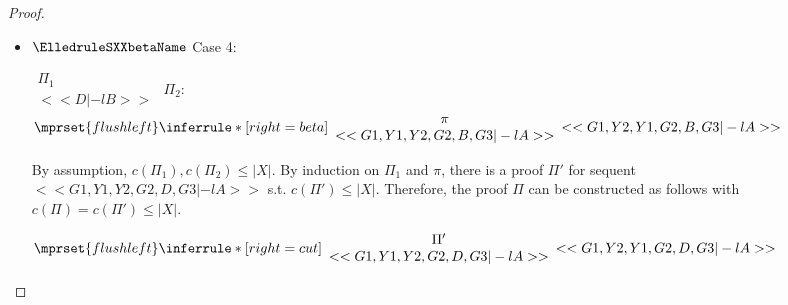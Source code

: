 \begin{proof}
\begin{enumerate}
\begin{itemize}
    \item $\ElledruleSXXbetaName$ Case 4:
      \begin{center}
        \scriptsize
        \begin{math}
          \begin{array}{c}
            \Pi_1 \\
            {<<D |-l B>>}
          \end{array}
        \end{math}
        \qquad\qquad
        $\Pi_2$:
        \begin{math}
          $$\mprset{flushleft}
          \inferrule* [right={\tiny beta}] {
            {
              \begin{array}{c}
                \pi \\
                {<<G1, Y1, Y2, G2, B, G3 |-l A>>}
              \end{array}
            }
          }{<<G1, Y2, Y1, G2, B, G3 |-l A>>}
        \end{math}
      \end{center}
      By assumption, $c(\Pi_1),c(\Pi_2)\leq |X|$. By induction on $\Pi_1$ and $\pi$, there is
      a proof $\Pi'$ for sequent $<<G1, Y1, Y2, G2, D, G3 |-l A>>$ s.t. $c(\Pi') \leq |X|$.
      Therefore, the proof $\Pi$ can be constructed as follows with
      $c(\Pi) = c(\Pi') \leq |X|$.
      \begin{center}
        \scriptsize
        \begin{math}
          $$\mprset{flushleft}
          \inferrule* [right={\tiny cut}] {
            {
              \begin{array}{cc}
                \Pi' \\
                {<<G1, Y1, Y2, G2, D, G3 |-l A>>}
              \end{array}
            }
          }{<<G1, Y2, Y1, G2, D, G3 |-l A>>}
        \end{math}
      \end{center}
  
    \end{itemize}

  \end{enumerate}
\end{proof}



